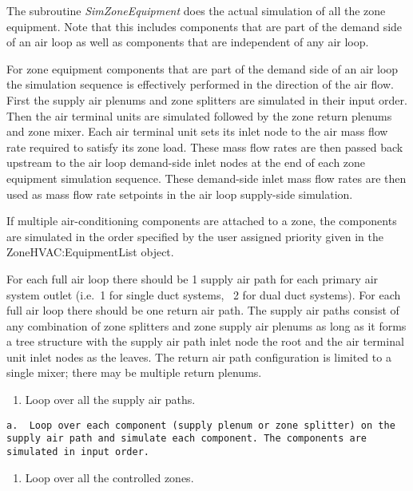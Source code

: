 The subroutine \emph{SimZoneEquipment} does the actual simulation of all the zone equipment. Note that this includes components that are part of the demand side of an air loop as well as components that are independent of any air loop.

For zone equipment components that are part of the demand side of an air loop the simulation sequence is effectively performed in the direction of the air flow. First the supply air plenums and zone splitters are simulated in their input order. Then the air terminal units are simulated followed by the zone return plenums and zone mixer. Each air terminal unit sets its inlet node to the air mass flow rate required to satisfy its zone load. These mass flow rates are then passed back upstream to the air loop demand-side inlet nodes at the end of each zone equipment simulation sequence. These demand-side inlet mass flow rates are then used as mass flow rate setpoints in the air loop supply-side simulation.

If multiple air-conditioning components are attached to a zone, the components are simulated in the order specified by the user assigned priority given in the ZoneHVAC:EquipmentList object.

For each full air loop there should be 1 supply air path for each primary air system outlet (i.e.~1 for single duct systems,~ 2 for dual duct systems). For each full air loop there should be one return air path. The supply air paths consist of any combination of zone splitters and zone supply air plenums as long as it forms a tree structure with the supply air path inlet node the root and the air terminal unit inlet nodes as the leaves. The return air path configuration is limited to a single mixer; there may be multiple return plenums.

\begin{enumerate}
\def\labelenumi{\arabic{enumi}.}
\tightlist
\item
  Loop over all the supply air paths.
\end{enumerate}

\begin{lstlisting}
a.  Loop over each component (supply plenum or zone splitter) on the supply air path and simulate each component. The components are simulated in input order.
\end{lstlisting}

\begin{enumerate}
\def\labelenumi{\arabic{enumi}.}
\setcounter{enumi}{1}
\tightlist
\item
  Loop over all the controlled zones.
\end{enumerate}

